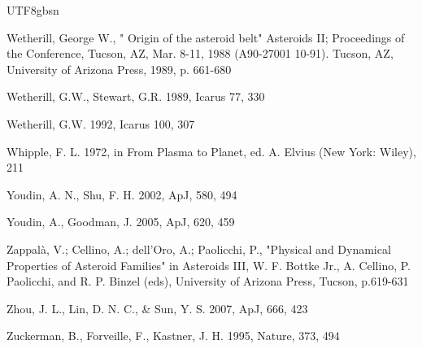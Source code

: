 \documentclass[tighten]{aastex6}
\begin{document}
\begin{CJK*}{UTF8}{gbsn}
\begin{thebibliography}{}
 Wetherill, George W., " Origin of the asteroid belt"
Asteroids II; Proceedings of the Conference, Tucson, AZ, Mar. 8-11, 1988 (A90-27001 10-91). Tucson, AZ, University of Arizona Press, 1989, p. 661-680

 Wetherill, G.W., Stewart, G.R. 1989, Icarus 77, 330

 Wetherill, G.W. 1992, Icarus 100, 307

 Whipple, F. L. 1972, in From Plasma to Planet, ed. A. Elvius (New York: Wiley), 211

 Youdin, A. N., Shu, F. H. 2002, ApJ, 580, 494

 Youdin, A., Goodman, J. 2005, ApJ, 620, 459

 Zappalà, V.; Cellino, A.; dell'Oro, A.; Paolicchi, P., "Physical and Dynamical Properties of Asteroid Families" in Asteroids III, W. F. Bottke Jr., A. Cellino, P. Paolicchi, and R. P. Binzel (eds), University of Arizona Press, Tucson, p.619-631

 Zhou, J. L., Lin, D. N. C., \& 
Sun, Y. S. 2007, ApJ, 666, 423

 Zuckerman, B., Forveille, F.,  Kastner, J. H. 1995, Nature, 373, 494 

\end{thebibliography}
\end{CJK*}
\end{document}
